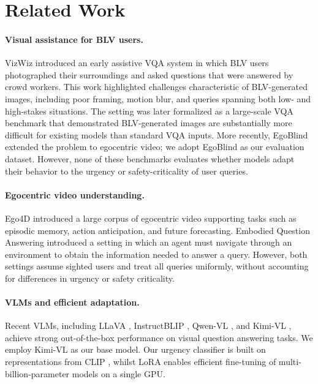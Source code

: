 \documentclass{article}
\begin{document}
\section{Related Work} \label{sec:related} 
\paragraph{Visual assistance for BLV users.}
VizWiz \cite{bigham2010vizwiz} introduced an early assistive VQA system in which BLV users photographed their surroundings and asked questions that were answered by crowd workers. This work highlighted challenges characteristic of BLV-generated images, including poor framing, motion blur, and queries spanning both low- and high-stakes situations. The setting was later formalized as a large-scale VQA benchmark \cite{gurari2018vizwiz} that demonstrated BLV-generated images are substantially more difficult for existing models than standard VQA inputs. More recently, EgoBlind \cite{xiao2025egoblind} extended the problem to egocentric video; we adopt EgoBlind as our evaluation dataset. However, none of these benchmarks evaluates whether models adapt their behavior to the urgency or safety-criticality of user queries.

\paragraph{Egocentric video understanding.}
Ego4D \cite{grauman2021ego4d} introduced a large corpus of egocentric video supporting tasks such as episodic memory, action anticipation, and future forecasting. Embodied Question Answering \cite{das2018embodied} introduced a setting in which an agent must navigate through an environment to obtain the information needed to answer a query. However, both settings assume sighted users and treat all queries uniformly, without accounting for differences in urgency or safety criticality.

\paragraph{VLMs and efficient adaptation.}
Recent VLMs, including LLaVA \cite{liu2023llava}, InstructBLIP \cite{dai2023instructblip}, Qwen-VL \cite{bai2023qwenvl}, and Kimi-VL \cite{kimivl2025}, achieve strong out-of-the-box performance on visual question answering tasks. We employ Kimi-VL as our base model. Our urgency classifier is built on representations from CLIP \cite{radford2021clip}, whilst LoRA \cite{hu2022lora} enables efficient fine-tuning of multi-billion-parameter models on a single GPU.
\end{document}
